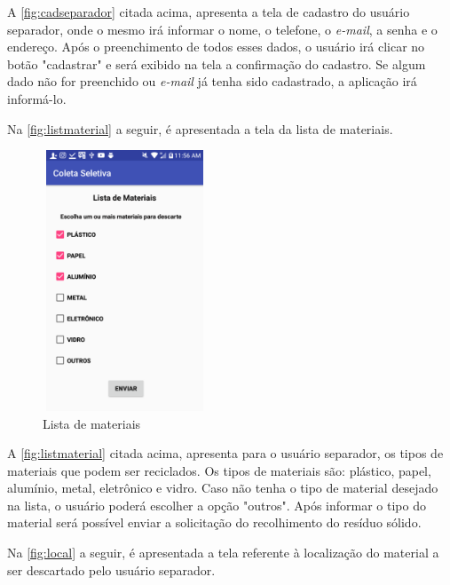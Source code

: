 A \autoref{fig:cadseparador} citada acima, apresenta a tela de cadastro do usuário separador, onde o mesmo irá informar o nome, o telefone, o \textit{e-mail}, a senha e o endereço. Após o preenchimento de todos esses dados, o usuário irá clicar no botão "cadastrar" e será exibido na tela a confirmação do cadastro. Se algum dado não for preenchido ou \textit{e-mail} já tenha sido cadastrado, a aplicação irá informá-lo.


Na \autoref{fig:listmaterial} a seguir, é apresentada a tela da lista de materiais. 


\begin{figure}[H]
	\begin{Center}
		\includegraphics[width=1.93in,height=3.06in]{./media/image60.png}
	\end{Center}
	\caption{Lista de materiais}
	\label{fig:listmaterial}
\end{figure}

A \autoref{fig:listmaterial} citada acima, apresenta para o usuário separador, os tipos de materiais que podem ser reciclados. Os tipos de materiais são: plástico, papel, alumínio, metal, eletrônico e vidro. Caso não tenha o tipo de material desejado na lista, o usuário poderá escolher a opção "outros". Após informar o tipo do material será possível enviar a solicitação do recolhimento do resíduo sólido.

Na \autoref{fig:local} a seguir, é apresentada a tela referente à localização do material a ser descartado pelo usuário separador. 

